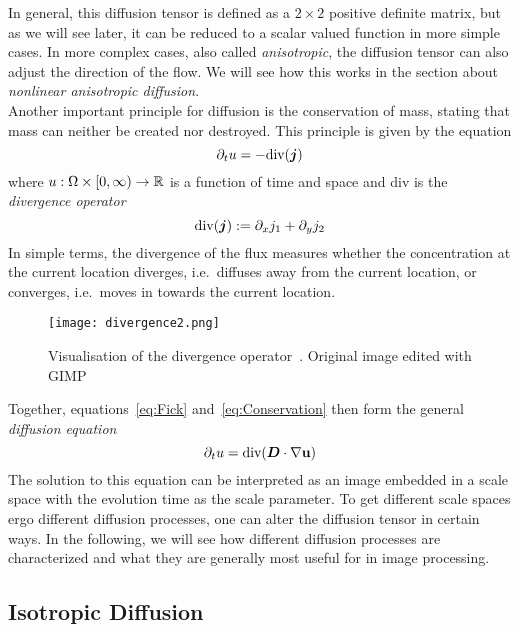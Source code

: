 \noindent In general, this diffusion
tensor is defined as a
$2\times2$ positive definite matrix, but as we will see later, it can be reduced to a scalar 
valued function in more simple cases.
In more complex cases, also called \textit{anisotropic}, the diffusion tensor can also adjust the
direction of the flow. We will see how this works in the section about \textit{nonlinear
anisotropic diffusion}.\\
Another important principle for diffusion is the conservation of mass, stating that mass can neither be
created nor destroyed.
This principle is given by the equation
\begin{equation}
    \partial_t u = - \textnormal{div}(\boldsymbol j)\label{eq:Conservation}
\end{equation}
where $u: \Omega \times [0, \infty) \rightarrow \mathbb{R}$ is a function of time and space and div
is the \textit{divergence operator}
\begin{equation}
    \textnormal{div}(\boldsymbol j) := \partial_x j_1 + \partial_y j_2
\end{equation}
In simple terms, the divergence of the flux measures whether the concentration at the current
location diverges, i.e.\ diffuses away from the current location, or converges, i.e.\ moves in
towards the current location.
\begin{figure}[H]
    \centering
    \texttt{[image: divergence2.png]}
    \caption{Visualisation of the divergence operator~\cite{img-divergence}. Original image edited
    with GIMP~\cite{gimp}}\label{fig:Divergence}
\end{figure}
\noindent Together, equations~\eqref{eq:Fick} and~\eqref{eq:Conservation} then form the general \textit{diffusion
    equation}~\cite{dic, weickert96}
\begin{equation}
    \partial_t u = \textnormal{div}(\boldsymbol D\cdot\mathbf{\nabla} \mathbf{u})\label{eq:Diffusion}
\end{equation}
The solution to this equation can be interpreted as an image embedded in a scale space with the
evolution time as the scale parameter. To get different scale spaces ergo different diffusion
processes, one can alter the diffusion tensor in certain ways.
In the following, we will see how different diffusion processes are characterized and what they are
generally most useful for in image processing.

\subsection{Isotropic Diffusion}
